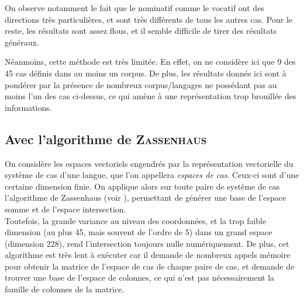 \documentclass{cours}
\begin{document}
\begin{table}
	\renewcommand{\arraystretch}{1.1}
        \centering
	\label{tab:angle_voc}
\end{table}


On observe notamment le fait que le nominatif comme le vocatif ont des directions très particulières, et sont très différents de tous les autres cas. Pour le reste, les résultats sont assez flous, et il semble difficile de tirer des résultats généraux.

\medskip
Néanmoins, cette méthode est très limitée. En effet, on ne considère ici que 9 des 45 cas définis dans au moins un corpus.
De plus, les résultats donnés ici sont à pondérer par la présence de nombreux corpus/langages ne possédant pas au moins l'un des cas ci-dessus, ce qui amène à une représentation trop brouillée des informations.


\subsection{Avec l'algorithme de \textsc{Zassenhaus}}\label{subsec:zassenhaus}
On considère les espaces vectoriels engendrés par la représentation vectorielle du système de cas d'une langue, que l'on appellera \emph{espaces de cas}.
Ceux-ci sont d'une certaine dimension finie.
On applique alors sur toute paire de système de cas l'algorithme de Zassenhaus (voir \cite{zassenhaus}), permettant de générer une base de l'espace somme et de l'espace intersection.\\
Toutefois, la grande variance au niveau des coordonnées, et la trop faible dimension (au plus 45, mais souvent de l'ordre de 5) dans un grand espace (dimension 228), rend l'intersection toujours nulle numériquement.
De plus, cet algorithme est très lent à exécuter car il demande de nombreux appels mémoire pour obtenir la matrice de l'espace de cas de chaque paire de cas, et demande de trouver une base de l'espace de colonnes, ce qui n'est pas nécessairement la famille de colonnes de la matrice.
\end{document}
